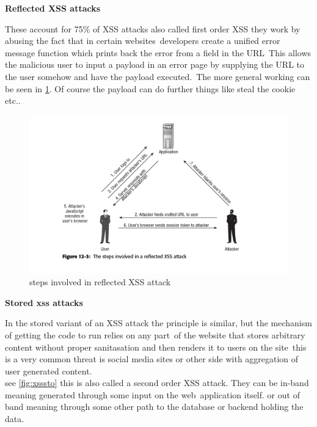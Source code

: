 \textbf{Reflected XSS attacks}

These account for 75\% of XSS attacks also called first order XSS they work by abusing the fact that in certain websites\
developers create a unified error message function which prints back the error from a field in the URL\
This allows the malicious user to input a payload in an error page by supplying the URL to the user somehow and have the payload executed.\
The more general working can be seen in \ref{fig:xssref}. Of course the payload can do further things like steal the cookie etc..\

\begin{figure}
\centering
\includegraphics[width=1\textwidth]{refl-XSS.png}
\caption{\label{fig:xssref}steps involved in reflected XSS attack}
\end{figure}

\textbf{Stored xss attacks}

In the stored variant of an XSS attack the principle is similar, but the mechanism of getting the code to run relies on any part\
of the website that stores arbitrary content without proper sanitasation and then renders it to users on the site\
this is a very common threat is social media sites or other side with aggregation of user generated content.\\
see \ref{fig:xsssto} this is also called a second order XSS attack. They can be in-band meaning generated through some input on the web\
application itself. or out of band meaning through some other path to the database or backend holding the data.\

